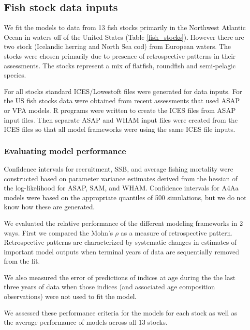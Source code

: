 \documentclass[12pt,letterpaper, leqno]{article}
\begin{document}
\subsection*{Fish stock data inputs}

We fit the models to data from 13 fish stocks primarily in the Northwest Atlantic Ocean in waters off of the United States (Table \ref{fish_stocks}). However there are two stock (Icelandic herring and North Sea cod) from European waters. The stocks were chosen primarily due to presence of retrospective patterns in their assessments. The stocks represent a mix of flatfish, roundfish and semi-pelagic species. 

For all stocks standard ICES/Lowestoft files were generated for data inputs. For the US fish stocks data were obtained from recent assessments that used ASAP or VPA models. R programs were written to create the ICES files from ASAP input files. Then separate ASAP and WHAM input files were created from the ICES files so that all model frameworks were using the same ICES file inputs.

\subsubsection*{Evaluating model performance}

Confidence intervals for recruitment, SSB, and average fishing mortality were constructed based on parameter variance estimates derived from the hessian of the log-likelihood for ASAP, SAM, and WHAM. Confidence intervals for A4Aa models were based on the appropriate quantiles of 500 simulations, but we do not know how these are generated.


We evaluated the relative performance of the different modeling frameworks in 2 ways. First we compared the Mohn's $\rho$ \citep{mohn99} as a measure of retrospective pattern. Retrospective patterns are characterized by systematic changes in estimates of important model outputs when terminal years of data are sequentially removed from the fit.

We also measured the error of predictions of indices at age during the the last three years of data when those indices (and associated age composition observations) were not used to fit the model.

We assessed these performance criteria for the models for each stock as well as the average performance of models across all 13 stocks.


\end{document}
